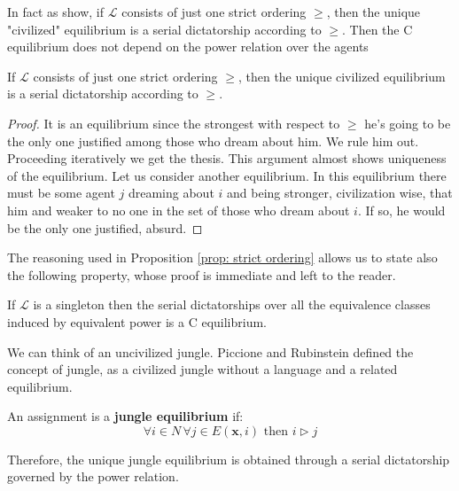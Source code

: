 
\color{black}{A language truly brings civilization to a jungle if it has more than one criterion.}\color{black}{} In fact as \cite[RY]{RY} show, if $\mathcal{L}$ consists of just one strict ordering $\geq$, then the unique "civilized" equilibrium is a serial dictatorship according to $\geq$. Then the C equilibrium does not depend on the power relation over the agents\color{black}{ and the civilized jungle is just a normal jungle with another power relation.}  \color{black} 

\begin{proposition}\label{prop: strict ordering}
    If $\mathcal{L}$ consists of just one strict ordering $\geq$, then the unique civilized equilibrium is a serial dictatorship according to $\geq$.
    \begin{proof}
        It is an equilibrium since the strongest with respect to $\geq$ he's going to be the only one justified among those who dream about him. We rule him out. Proceeding iteratively we get the thesis. This argument almost shows uniqueness of the equilibrium. Let us consider another equilibrium. In this equilibrium there must be some agent $j$ dreaming about $i$ and being stronger, civilization wise, that him and weaker to no one in the set of those who dream about $i$. If so, he would be the only one justified, absurd.
    \end{proof}
\end{proposition}

The reasoning used in Proposition \ref{prop: strict ordering} allows us to state also the following property, whose proof is immediate and left to the reader.

\begin{corollary}
    If $\mathcal{L}$ is a singleton then the serial dictatorships over all the equivalence classes induced by equivalent power is a C equilibrium.  
\end{corollary}

We can think of an uncivilized jungle. Piccione and Rubinstein \cite[PR]{P-R} defined the concept of jungle, as a civilized jungle without a language and a related equilibrium.

\begin{definition}
    An assignment is a \textbf{jungle equilibrium} if: \[\forall i \in N \, \forall j \in E(\textbf{x},i) \text{ then } i\triangleright j\]
\end{definition}

Therefore, the unique jungle equilibrium is obtained through a serial dictatorship governed by the power relation. 

